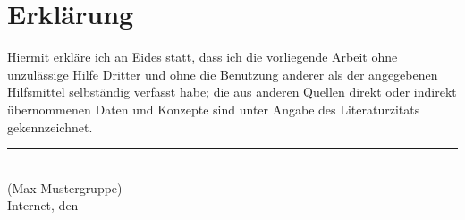 
\cleardoublepage
\thispagestyle{plain}
\vspace*{\fill}

\section*{Erklärung}

Hiermit erkläre ich an Eides statt, dass ich die vorliegende
Arbeit ohne unzulässige Hilfe Dritter und ohne die Benutzung anderer
als der angegebenen Hilfsmittel selbständig verfasst habe;
die aus anderen Quellen direkt oder indirekt übernommenen Daten und Konzepte
sind unter Angabe des Literaturzitats gekennzeichnet.

\vskip2cm

\rule{5cm}{0.4pt}\\
(Max Mustergruppe)\\
Internet, den \duedate